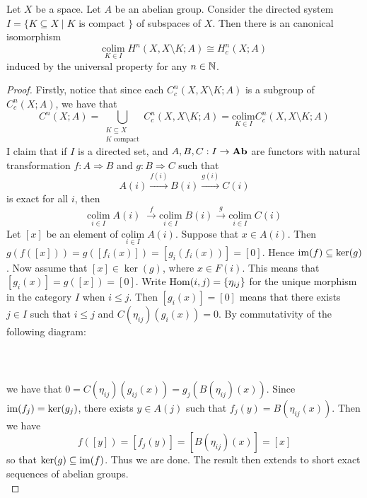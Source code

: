 \documentclass[a4paper]{article}
\begin{document}
\begin{prp}{}{} Let $X$ be a space. Let $A$ be an abelian group. Consider the directed system $I=\{K\subseteq X\;|\;K\text{ is compact }\}$ of subspaces of $X$. Then there is an canonical isomorphism $$\underset{K\in I}{\text{colim}}\;H^n(X,X\setminus K;A)\cong H_c^n(X;A)$$ induced by the universal property for any $n\in\mathbb{N}$. \tcbline
\begin{proof}
Firstly, notice that since each $C_c^n(X,X\setminus K;A)$ is a subgroup of $C_c^n(X;A)$, we have that $$C^n(X;A)=\bigcup_{\substack{K\subseteq X\\K\text{ compact}}}C_c^n(X,X\setminus K;A)=\underset{K\in I}{\text{colim}}C_c^n(X,X\setminus K;A)$$ I claim that if $I$ is a directed set, and $A,B,C:I\to\bold{Ab}$ are functors with natural transformation $f:A\Rightarrow B$ and $g:B\Rightarrow C$ such that $$A(i)\overset{f(i)}{\rightarrow}B(i)\overset{g(i)}{\rightarrow}C(i)$$ is exact for all $i$, then $$\underset{i\in I}{\text{colim}}\;A(i)\;\overset{f}{\rightarrow}\underset{i\in I}{\text{colim}}\;B(i)\overset{g}{\rightarrow}\underset{i\in I}{\text{colim}}\;C(i)$$ Let $[x]$ be an element of $\underset{i\in I}{\text{colim}}\;A(i)$. Suppose that $x\in A(i)$. Then $g(f([x]))=g([f_i(x)])=[g_i(f_i(x))]=[0]$. Hence $\operatorname{im}(f)\subseteq\ker(g)$. Now assume that $[x]\in\ker(g)$, where $x\in F(i)$. This means that $[g_i(x)]=g([x])=[0]$. Write $\operatorname{Hom}(i,j)=\{\eta_{ij}\}$ for the unique morphism in the category $I$ when $i\leq j$. Then $[g_i(x)]=[0]$ means that there exists $j\in I$ such that $i\leq j$ and $C(\eta_{ij})(g_i(x))=0$. By commutativity of the following diagram: \\~\\
\\~\\
we have that $0=C(\eta_{ij})(g_{ij}(x))=g_j(B(\eta_{ij})(x))$. Since $\operatorname{im}(f_j)=\ker(g_j)$, there exists $y\in A(j)$ such that $f_j(y)=B(\eta_{ij}(x))$. Then we have $$f([y])=[f_j(y)]=[B(\eta_{ij})(x)]=[x]$$ so that $\ker(g)\subseteq\operatorname{im}(f)$. Thus we are done. The result then extends to short exact sequences of abelian groups. \\


\end{proof}
\end{prp}
\end{document}
